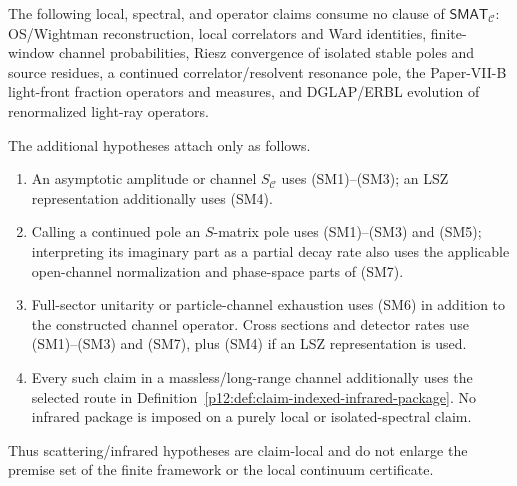 \documentclass[12pt,a4paper]{article}
\begin{document}
\begin{theorem}
\label{p12:thm:scattering-hypothesis-firewall}
The following local, spectral, and operator claims consume no clause of
\(\mathsf{SMAT}_{\mathcal C}\): OS/Wightman reconstruction, local correlators
and Ward identities, finite-window channel probabilities, Riesz convergence of
isolated stable poles and source residues, a continued correlator/resolvent
resonance pole, the Paper-VII-B light-front fraction operators and measures, and
DGLAP/ERBL evolution of renormalized light-ray operators.

The additional hypotheses attach only as follows.
\begin{enumerate}[label=\textnormal{(\alph*)},leftmargin=2.4em]
\item An asymptotic amplitude or channel \(S_{\mathcal C}\) uses
      \textnormal{(SM1)--(SM3)}; an LSZ representation additionally uses
      \textnormal{(SM4)}.
\item Calling a continued pole an \(S\)-matrix pole uses
      \textnormal{(SM1)--(SM3)} and \textnormal{(SM5)}; interpreting its
      imaginary part as a partial decay rate also uses the applicable
      open-channel normalization and phase-space parts of \textnormal{(SM7)}.
\item Full-sector unitarity or particle-channel exhaustion uses
      \textnormal{(SM6)} in addition to the constructed channel operator.
      Cross sections and detector rates use \textnormal{(SM1)--(SM3)} and
      \textnormal{(SM7)}, plus \textnormal{(SM4)} if an LSZ representation is
      used.
\item Every such claim in a massless/long-range channel additionally uses the
      selected route in
      Definition~\ref{p12:def:claim-indexed-infrared-package}.  No infrared
      package is imposed on a purely local or isolated-spectral claim.
\end{enumerate}
Thus scattering/infrared hypotheses are claim-local and do not enlarge the
premise set of the finite framework or the local continuum certificate.
\end{theorem}
\end{document}
